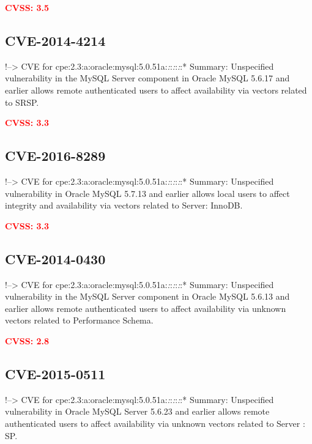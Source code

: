 \documentclass[a4paper, 12pt]{article}
\begin{document}
\textbf{\textcolor{red}{CVSS: 3.5}}

\hypertarget{cve-2014-4214}{%
\subsection{CVE-2014-4214}\label{cve-2014-4214}}

!--\textgreater{} CVE for
cpe:2.3:a:oracle:mysql:5.0.51a:\emph{:}:\emph{:}:\emph{:}:* Summary:
Unspecified vulnerability in the MySQL Server component in Oracle MySQL
5.6.17 and earlier allows remote authenticated users to affect
availability via vectors related to SRSP.

\textbf{\textcolor{red}{CVSS: 3.3}}

\hypertarget{cve-2016-8289}{%
\subsection{CVE-2016-8289}\label{cve-2016-8289}}

!--\textgreater{} CVE for
cpe:2.3:a:oracle:mysql:5.0.51a:\emph{:}:\emph{:}:\emph{:}:* Summary:
Unspecified vulnerability in Oracle MySQL 5.7.13 and earlier allows
local users to affect integrity and availability via vectors related to
Server: InnoDB.

\textbf{\textcolor{red}{CVSS: 3.3}}

\hypertarget{cve-2014-0430}{%
\subsection{CVE-2014-0430}\label{cve-2014-0430}}

!--\textgreater{} CVE for
cpe:2.3:a:oracle:mysql:5.0.51a:\emph{:}:\emph{:}:\emph{:}:* Summary:
Unspecified vulnerability in the MySQL Server component in Oracle MySQL
5.6.13 and earlier allows remote authenticated users to affect
availability via unknown vectors related to Performance Schema.

\textbf{\textcolor{red}{CVSS: 2.8}}

\hypertarget{cve-2015-0511}{%
\subsection{CVE-2015-0511}\label{cve-2015-0511}}

!--\textgreater{} CVE for
cpe:2.3:a:oracle:mysql:5.0.51a:\emph{:}:\emph{:}:\emph{:}:* Summary:
Unspecified vulnerability in Oracle MySQL Server 5.6.23 and earlier
allows remote authenticated users to affect availability via unknown
vectors related to Server : SP.
\end{document}
